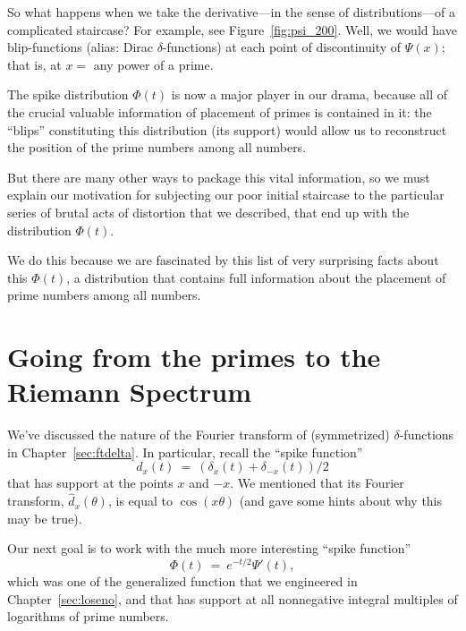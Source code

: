 \documentclass[openany]{book}
\theoremstyle{plain}
\theoremstyle{definition}
\newcommand{\todo}[1]{\par\vspace{1em}{\small---------\\{{\bf To be done:} #1}\\-----------}\par\vspace{1em}}
\begin{document}
So what happens when we take the derivative---in the sense of
distributions---of a complicated staircase?  For example, see
Figure~\ref{fig:psi_200}.  Well, we would have blip-functions (alias:
Dirac $\delta$-functions) at each point of discontinuity of $\Psi(x)$;
that is, at $x=$ any power of a prime.

The spike distribution $\Phi(t)$ is now a major player in our drama,
because all of the crucial valuable information of placement of primes
is contained in it: the ``blips'' constituting this distribution (its
support) would allow us to reconstruct the position of the prime
numbers among all numbers.

But there are many other ways to package this vital information, so we
must explain our motivation for subjecting our poor initial staircase
to the particular series of brutal acts of distortion that we
described, that end up with the distribution $\Phi(t)$.

We do this because we are fascinated by this list of very surprising
facts about this $\Phi(t)$, a distribution that contains full
information about the placement of prime numbers among all numbers.



\chapter{Going from the primes to the Riemann Spectrum}

 
 
 
We've discussed the nature of the Fourier transform of (symmetrized)
$\delta$-functions in Chapter~\ref{sec:ftdelta}. In particular, recall
the ``spike function'' $$d_x(t) \ = \ (\delta_x(t) +
\delta_{-x}(t))/2$$ that has support at the points $x$ and $-x$.  We
mentioned that its Fourier transform, ${\hat d}_x(\theta)$, is equal
to $\cos(x\theta)$ (and gave some hints about why this may be true).
  

Our next goal is to work with the much more interesting ``spike
function'' $$\Phi(t) \ = \ e^{- t/2}\Psi'(t),$$ which was one of the
generalized function that we engineered in Chapter~\ref{sec:loseno},
and that has support at all nonnegative integral multiples of
logarithms of prime numbers.
   
\end{document}
